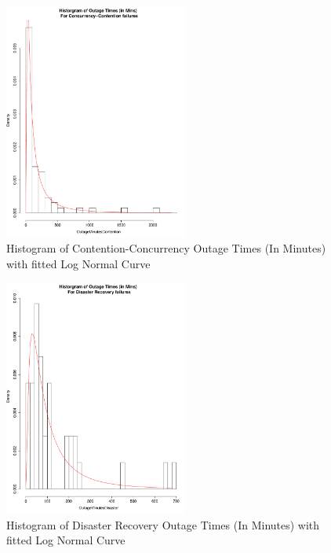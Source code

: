 \documentclass[conference]{IEEEtran}
\begin{document}
\begin{figure}
\begin{center}
\includegraphics[width=6cm]{graph7.pdf} 
\caption{ Histogram of Contention-Concurrency Outage Times (In Minutes) with fitted Log Normal Curve}
\end{center}
\label{fig:outagedistribution}
\end{figure}


\begin{figure}
\begin{center}
\includegraphics[width=6cm]{graph8.pdf} 
\caption{ Histogram of Disaster Recovery  Outage Times (In Minutes) with fitted Log Normal Curve}
\end{center}
\label{fig:outagedistribution}
\end{figure}
\end{document}
